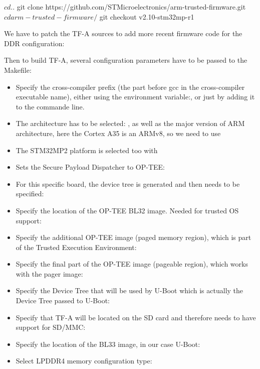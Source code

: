 \begin{bashinput}
$ cd ..
$ git clone https://github.com/STMicroelectronics/arm-trusted-firmware.git
$ cd arm-trusted-firmware/
$ git checkout v2.10-stm32mp-r1
\end{bashinput}

We have to patch the TF-A sources to add more recent firmware code for
the DDR configuration:


Then to build TF-A, several configuration parameters have to be passed
to the Makefile:

\begin{itemize}
\item Specify the cross-compiler prefix (the part before gcc in the
  cross-compiler executable name), either using the environment
  variable:, or just
  by adding it to the  commande line.
\item The architecture has to be selected: , as
  well as the major version of ARM architecture, here the Cortex A35
  is an ARMv8, so we need to use 
\item The STM32MP2 platform is selected too with 
\item Sets the Secure Payload Dispatcher to OP-TEE: 
\item For this specific board, the device tree is generated and then
  needs to be specified: 
\item Specify the location of the OP-TEE BL32 image. Needed for
  trusted OS support:
\item Specify the additional OP-TEE image (paged memory region), which
  is part of the Trusted Execution Environment:
\item Specify the final part of the OP-TEE image (pageable region),
  which works with the pager image:
\item Specify the Device Tree that will be used by U-Boot which is
  actually the Device Tree passed to U-Boot:
\item Specify that TF-A will be located on the SD card and therefore
  needs to have support for SD/MMC: 
\item Specify the location of the BL33 image, in our case U-Boot:
\item Select LPDDR4 memory configuration type:
\end{itemize}

